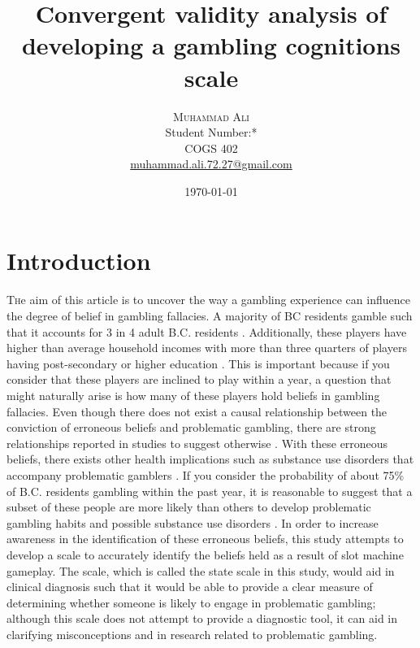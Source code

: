\documentclass[twoside,twocolumn]{article}
\title{Convergent validity analysis of developing a gambling cognitions scale} %
\author{%
  \textsc{Muhammad Ali} \\[1ex] %
\normalsize Student Number:*\\
\normalsize COGS 402 \\ %
\normalsize \href{mailto:muhammad.ali.72.27@gmail.com.com}{muhammad.ali.72.27@gmail.com} %
}
\date{\today} %
\begin{document}
\maketitle


\section{Introduction}

\lettrine[nindent=0em,lines=3]{T}he aim of this article is to uncover the way a gambling experience can influence the degree of belief in gambling fallacies. A majority of BC residents gamble such that it accounts for 3 in 4 adult B.C. residents \cite{bclc}. Additionally, these players have higher than average household incomes with more than three quarters of players having post-secondary or higher education \cite{bclc}. This is important because if you consider that these players are inclined to play within a year, a question that might naturally arise is how many of these players hold beliefs in gambling fallacies. Even though there does not exist a causal relationship between the conviction of erroneous beliefs and problematic gambling, there are strong relationships reported in studies to suggest otherwise \cite{Ladouceur:2004, raylu:2004, darke:1997}. With these erroneous beliefs, there exists other health implications such as substance use disorders that accompany problematic gamblers \cite{rush:2008}. If you consider the probability of about 75\% of B.C. residents gambling within the past year, it is reasonable to suggest that a subset of these people are more likely than others to develop problematic gambling habits and possible substance use disorders \cite{bclc}. In order to increase awareness in the identification of these erroneous beliefs, this study attempts to develop a scale to accurately identify the beliefs held as a result of slot machine gameplay. The scale, which is called the state scale in this study, would aid in clinical diagnosis such that it would be able to provide a clear measure of determining whether someone is likely to engage in problematic gambling; although this scale does not attempt to provide a diagnostic tool, it can aid in clarifying misconceptions and in research related to problematic gambling.
\end{document}
